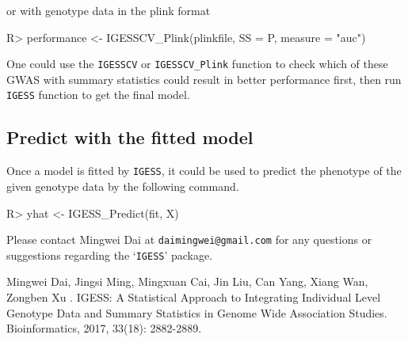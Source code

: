 \documentclass[11pt]{article}
\begin{document}
or with genotype data in the plink format
\begin{Schunk}
\begin{Sinput}
R> performance <- IGESSCV_Plink(plinkfile, SS = P, measure = "auc")
\end{Sinput}
\end{Schunk}


One could use the \texttt{IGESSCV} or \texttt{IGESSCV\_Plink} function to check which of these GWAS with summary statistics could result in better performance first, then run \texttt{IGESS} function to get the final model.





\subsection{Predict with the fitted model}\label{predict}
Once a model is fitted by \texttt{IGESS}, it could be used to predict the phenotype of the given genotype data by the following command.
\begin{Schunk}
\begin{Sinput}
R> yhat <- IGESS_Predict(fit, X)
\end{Sinput}
\end{Schunk}

Please contact Mingwei Dai at \texttt{daimingwei@gmail.com} for any questions or suggestions regarding the `\texttt{IGESS}' package.


\begin{thebibliography}{99}
 Mingwei Dai, Jingsi Ming, Mingxuan Cai, Jin Liu, Can Yang, Xiang Wan, Zongben Xu . IGESS: A Statistical Approach to Integrating Individual Level Genotype Data and Summary Statistics in Genome Wide Association Studies. Bioinformatics, 2017, 33(18): 2882-2889.

\end{thebibliography}
\end{document}
